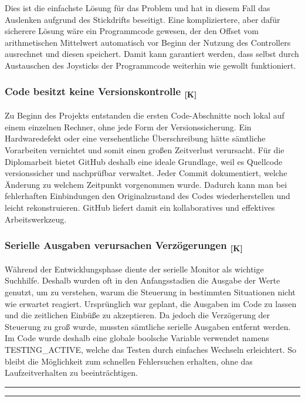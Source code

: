 \documentclass[a4paper,12pt]{article}
\begin{document}
Dies ist die einfachste Lösung für das Problem und hat in diesem Fall das Auslenken aufgrund des Stickdrifts beseitigt. Eine kompliziertere, aber dafür sicherere Lösung wäre ein Programmcode gewesen, der den Offset vom arithmetischen Mittelwert automatisch vor Beginn der Nutzung des Controllers ausrechnet und diesen speichert. Damit kann garantiert werden, dass selbst durch Austauschen des Joysticks der Programmcode weiterhin wie gewollt funktioniert. 

\subsubsection{\texorpdfstring{Code besitzt keine Versionskontrolle \textsubscript{[K]}}{Code besitzt keine Versionskontrolle [K]}}
Zu Beginn des Projekts entstanden die ersten Code-Abschnitte noch lokal auf einem einzelnen Rechner, ohne jede Form der Versionssicherung. Ein Hardwaredefekt oder eine versehentliche Überschreibung hätte sämtliche Vorarbeiten vernichtet und somit einen großen Zeitverlust verursacht. Für die Diplomarbeit bietet GitHub deshalb eine ideale Grundlage, weil es Quellcode versionssicher und nachprüfbar verwaltet. Jeder Commit dokumentiert, welche Änderung zu welchem Zeitpunkt vorgenommen wurde. Dadurch kann man bei fehlerhaften Einbindungen den Originalzustand des Codes wiederherstellen und leicht rekonstruieren. GitHub liefert damit ein kollaboratives und effektives Arbeitswerkzeug.

\subsubsection{\texorpdfstring{Serielle Ausgaben verursachen Verzögerungen \textsubscript{[K]}}{Serielle Ausgaben verursachen Verzögerungen [K]}}
Während der Entwicklungsphase diente der serielle Monitor als wichtige Suchhilfe. Deshalb wurden oft in den Anfangsstadien die Ausgabe der Werte genutzt, um zu verstehen, warum die Steuerung in bestimmten Situationen nicht wie erwartet reagiert. Ursprünglich war geplant, die Ausgaben im Code zu lassen und die zeitlichen Einbüße zu akzeptieren. Da jedoch die Verzögerung der Steuerung zu groß wurde, mussten sämtliche serielle Ausgaben entfernt werden. Im Code wurde deshalb eine globale boolsche Variable verwendet namens TESTING\_ACTIVE, welche das Testen durch einfaches Wechseln erleichtert. So bleibt die Möglichkeit zum schnellen Fehlersuchen erhalten, ohne das Laufzeitverhalten zu beeinträchtigen. 
\newline\noindent\rule{\linewidth}{0.4pt}  %

\noindent\rule{\linewidth}{0.4pt}\\[0.5em]  %
\end{document}
